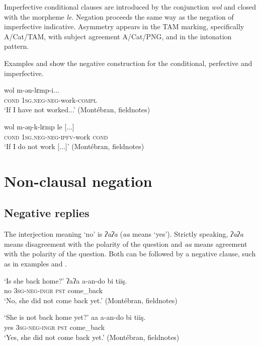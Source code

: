 \documentclass[output=paper,colorlinks,citecolor=brown]{langscibook}
\begin{document}
Imperfective conditional clauses are introduced by the conjunction \textit{wol} and closed with the morpheme \textit{le}. Negation proceeds the same way as the negation of imperfective indicative. Asymmetry appears in the TAM marking, specifically A/Cat/TAM, with subject agreement A/Cat/PNG, and in the intonation pattern. 

 Examples  and  show the negative construction for the conditional, perfective and imperfective.

\ea\label{ex:mank:55}
    \gll wol m-ən-lɛmp-i...\\
         \textsc{cond} \textsc{1sg.neg-neg-}work\textsc{{}-compl}\\
    \glt ‘If I have not worked...’ (Montébran, fieldnotes)
\z

\ea\label{ex:mank:56}
    \gll wol m-əŋ-k-lɛmp le [...]\\
         \textsc{cond} \textsc{1sg.neg-neg-ipfv-}work \textsc{cond}\\
    \glt ‘If I do not work [...]’ (Montébran, fieldnotes)
\z

\section{Non-clausal negation}\label{sec:mank:3}
\subsection{Negative replies}\label{sec:mank:3.1}

The interjection meaning ‘no’ is \textit{ʔaʔa} (\textit{aa} means ‘yes’). Strictly speaking, \textit{ʔaʔa} means disagreement with the polarity of the question and \textit{aa} means agreement with the polarity of the question. Both can be followed by a negative clause, such as in examples  and .

\ea\label{ex:mank:57}
    \glt ‘Is she back home?’ \medskip\newline 
    \gll ʔaʔa a-an-do bi tiiş.\\
         no \textsc{3sg-neg-ingr} \textsc{pst} come\_back\\
    \glt ‘No, she did not come back yet.’ (Montébran, fieldnotes)
\z

\ea\label{ex:mank:58}
    \glt ‘She is not back home yet?’ \medskip \newline 
    \gll aa a-an-do bi tiiş.\\
        yes \textsc{3sg-neg-ingr} \textsc{pst} come\_back \\
    \glt ‘Yes, she did not come back yet.’ (Montébran, fieldnotes)
\z
\end{document}
